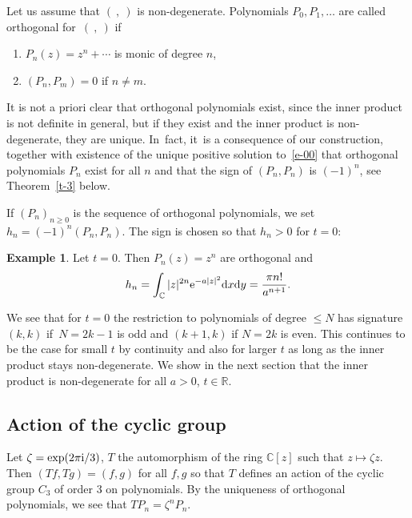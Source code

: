 \documentclass[pdftex]{sigma}
\numberwithin{equation}{section}
\theoremstyle{definition}
\newtheorem{Example}[Theorem]{Example}
\begin{document}
Let us assume that $(\ ,\ )$ is non-degenerate.
Polynomials $P_0,P_1,\dots$ are called orthogonal for~$(\ ,\ )$ if
\begin{enumerate}\itemsep=0pt
 \item[(1)] $P_n(z)=z^n+\cdots$ is monic of degree $n$,
 \item[(2)]$(P_n,P_m)=0$ if $n\neq m$.
\end{enumerate}
It is not a priori clear that orthogonal polynomials exist, since the inner product is not definite in general, but if they exist and the inner product is non-degenerate, they are unique. In~fact, it~is a consequence of our construction, together with existence of the unique positive solution to~\eqref{e-00} that orthogonal polynomials $P_n$ exist for all $n$ and that the sign of $(P_n,P_n)$ is $(-1)^n$, see Theorem~\ref{t-3} below.

If $(P_n)_{n\geq0}$ is the sequence of orthogonal polynomials, we set
$
h_n=(-1)^n(P_n,P_n)$.
The sign is chosen so that $h_n>0$ for $t=0$:
\begin{Example}
 Let $t=0$. Then $P_n(z)=z^n$ are orthogonal and
 \[
 h_n=\int_{\mathbb C} |z|^{2n}{\rm e}^{-a|z|^2}{\rm d}x{\rm d}y=\frac{\pi n!}{a^{n+1}}.
 \]
\end{Example}
We see that for $t=0$ the restriction to polynomials of degree $\leq N$ has signature $(k,k)$ if~${N=2k-1}$ is odd and $(k+1,k)$ if $N=2k$ is even. This continues to be the case for small $t$ by continuity and also for larger $t$ as long as the inner product stays non-degenerate. We show in the next section that the inner product is non-degenerate for all $a>0$, $t\in\mathbb R$.

\subsection{Action of the cyclic group}
Let $\zeta=\exp(2\pi {\rm i}/3)$, $T$ the automorphism of the ring $\mathbb C[z]$ such that $z\mapsto \zeta z$. Then $(Tf,Tg)=(f,g)$ for all $f,g$ so that $T$ defines an action of the cyclic group $C_3$ of order 3 on polynomials. By the uniqueness of orthogonal polynomials, we see that
$TP_n=\zeta^nP_n$.
\end{document}
